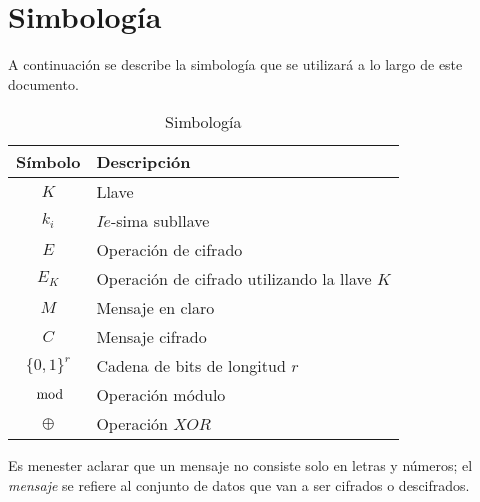 \section*{Simbología}

A continuación se describe la simbología que se utilizará a lo largo de
este documento.

\begin{table}[H]
    \caption{Simbología}\label{tab:simb}
    \begin{center}
        \begin{tabular}{c|l}
            Símbolo & Descripción \\
            \hline
            $K$ & Llave \\
            \hline
            $k_i$ & $I\acute{e}$-sima subllave \\
            \hline
            $E$ & Operación de cifrado \\
            \hline
            $E_K$ & Operación de cifrado utilizando la llave $K$ \\
            \hline
            $M$ & Mensaje en claro\\
            \hline
            $C$ & Mensaje cifrado\\
            \hline
            $\{0,1\}^r$ & Cadena de bits de longitud $r$ \\
            \hline
            $\mod$ & Operación módulo \\
            \hline
            $\oplus$ & Operación $XOR$ \\
            \hline
        \end{tabular}
    \end{center}
\end{table}

Es menester aclarar que un mensaje no consiste solo en letras y números;
el \textit{mensaje} se refiere al conjunto de datos que van a ser
cifrados o descifrados.

